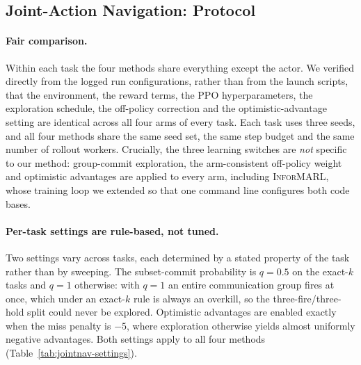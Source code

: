 \subsection{Joint-Action Navigation: Protocol}
\label{app:jointnav-protocol}

\paragraph{Fair comparison.}
Within each task the four methods share everything except the actor. We
verified directly from the logged run configurations, rather than from the
launch scripts, that the environment, the reward terms, the PPO
hyperparameters, the exploration schedule, the off-policy correction and the
optimistic-advantage setting are identical across all four arms of every task.
Each task uses three seeds, and all four methods share the same seed set, the
same step budget and the same number of rollout workers. Crucially, the three
learning switches are \emph{not} specific to our method: group-commit
exploration, the arm-consistent off-policy weight and optimistic advantages are
applied to every arm, including \textsc{InforMARL}, whose training loop we
extended so that one command line configures both code bases.

\paragraph{Per-task settings are rule-based, not tuned.}
Two settings vary across tasks, each determined by a stated property of the
task rather than by sweeping. The subset-commit probability is $q{=}0.5$ on the
exact-$k$ tasks and $q{=}1$ otherwise: with $q{=}1$ an entire communication
group fires at once, which under an exact-$k$ rule is always an overkill, so
the three-fire/three-hold split could never be explored. Optimistic advantages
are enabled exactly when the miss penalty is $-5$, where exploration otherwise
yields almost uniformly negative advantages. Both settings apply to all four
methods (Table~\ref{tab:jointnav-settings}).

